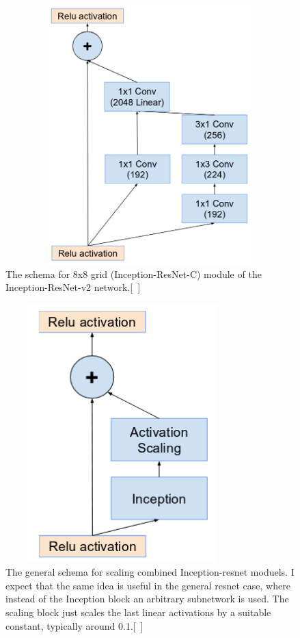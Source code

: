 \documentclass[a4paper,12pt, twoside]{NITKReport}
\begin{document}
\begin{figure}[h]
  \centering
    
    \includegraphics[height=10cm,width=13cm]{figure19.png}
    \caption{The schema for 8x8 grid (Inception-ResNet-C) module of the Inception-ResNet-v2 network.[~\cite{szegedy2017inception}]}
    \label{19}
  
  \end{figure}
\begin{figure}
\centering
    \includegraphics[height=10cm,width=9cm]{figure20.png}
    \caption{The general schema for scaling combined Inception-resnet moduels. I expect that the same idea is useful in the general resnet case, where instead of the Inception block an arbitrary subnetwork is used.  The scaling block just scales the last linear activations by a suitable constant, typically around 0.1.[~\cite{szegedy2017inception}]}
    \label{20}
\end{figure}
\end{document}
